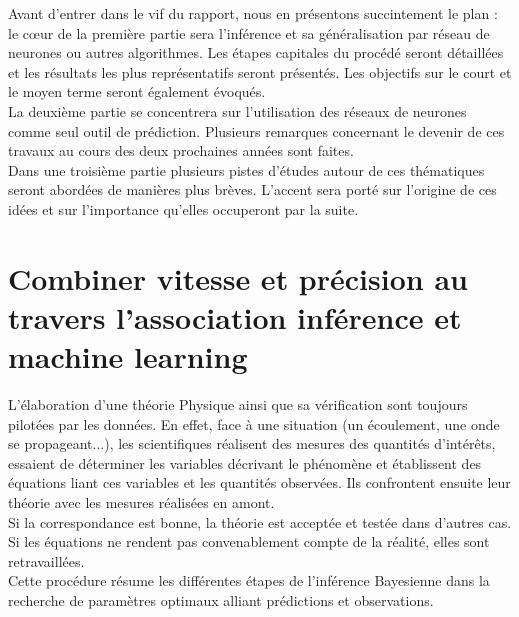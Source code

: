 \documentclass[a4paper,12pt]{article}
\newcommand\bk{\color{black}}
\newcommand\navy{\color{navy}}
\numberwithin{equation}{section} %
\begin{document}

\noindent Avant d'entrer dans le vif du rapport, nous en présentons succintement le plan : le cœur de la première partie sera l'inférence et sa généralisation par réseau de neurones ou autres algorithmes. Les étapes capitales du procédé seront détaillées et les résultats les plus représentatifs seront présentés. Les objectifs sur le court et le moyen terme seront également évoqués.\\
La deuxième partie se concentrera sur l'utilisation des réseaux de neurones comme seul outil de prédiction. Plusieurs remarques concernant le devenir de ces travaux au cours des deux prochaines années sont faites.\\
Dans une troisième partie plusieurs pistes d'études autour de ces thématiques seront abordées de manières plus brèves. L'accent sera porté sur l'origine de ces idées et sur l'importance qu'elles occuperont par la suite.

\pagebreak
{
\hypersetup{hidelinks}
\tableofcontents
}
\pagebreak

\navy \section{Combiner vitesse et précision au travers l'association inférence et machine learning} \label{combiNN_inference}
 \bk
\noindent L'élaboration d'une théorie Physique ainsi que sa vérification sont toujours pilotées par les données. En effet, face à une situation (un écoulement, une onde se propageant...), les scientifiques réalisent des mesures des quantités d'intérêts, essaient de déterminer les variables décrivant le phénomène et établissent des équations liant ces variables et les quantités observées. Ils confrontent ensuite leur théorie avec les mesures réalisées en amont. \\
Si la correspondance est bonne, la théorie est acceptée et testée dans d'autres cas. Si les équations ne rendent pas convenablement compte de la réalité, elles sont retravaillées. \\
Cette procédure résume les différentes étapes de l'inférence Bayesienne dans la recherche de paramètres optimaux alliant prédictions et observations.
 
\end{document}
